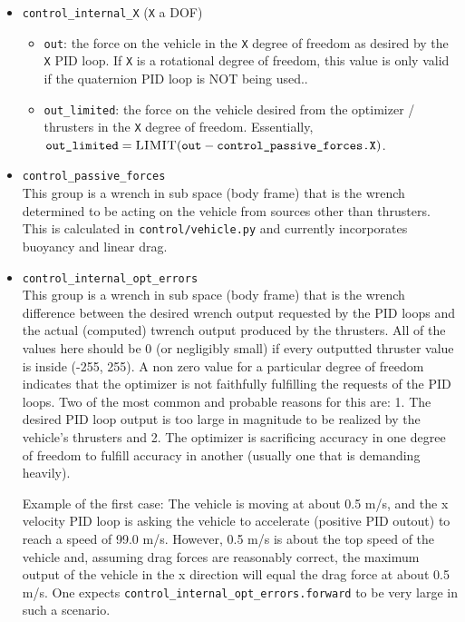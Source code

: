 \documentclass[11pt]{article}
\begin{document}
\begin{itemize}
    \item \texttt{control\_internal\_X} (\texttt{X} a DOF)\\
    \begin{itemize}
        \item \texttt{out}: the force on the vehicle in the \texttt{X} degree of freedom as desired by the \texttt{X} PID loop. If \texttt{X} is a rotational degree of freedom, this value is only valid if the quaternion PID loop is \textsc{NOT} being used..\\
        \item \texttt{out\_limited}: the force on the vehicle desired from the optimizer / thrusters in the \texttt{X} degree of freedom. Essentially, $\texttt{out\_limited} = \textsc{LIMIT}(\texttt{out} - \texttt{control\_passive\_forces.X})$.
    \end{itemize}

    \item \texttt{control\_passive\_forces}\\
        This group is a wrench in sub space (body frame) that is the wrench determined to be acting on the vehicle from sources other than thrusters. This is calculated in \texttt{control/vehicle.py} and currently incorporates buoyancy and linear drag.

    \item \texttt{control\_internal\_opt\_errors}\\
        This group is a wrench in sub space (body frame) that is the wrench difference between the desired wrench output requested by the PID loops and the actual (computed) twrench output produced by the thrusters. All of the values here should be 0 (or negligibly small) if every outputted thruster value is inside (-255, 255). A non zero value for a particular degree of freedom indicates that the optimizer is not faithfully fulfilling the requests of the PID loops. Two of the most common and probable reasons for this are: 1. The desired PID loop output is too large in magnitude to be realized by the vehicle's thrusters and 2. The optimizer is sacrificing accuracy in one degree of freedom to fulfill accuracy in another (usually one that is demanding heavily).

        Example of the first case: The vehicle is moving at about 0.5 m/s, and the x velocity PID loop is asking the vehicle to accelerate (positive PID outout) to reach a speed of 99.0 m/s. However, 0.5 m/s is about the top speed of the vehicle and, assuming drag forces are reasonably correct, the maximum output of the vehicle in the x direction will equal the drag force at about 0.5 m/s. One expects \texttt{control\_internal\_opt\_errors.forward} to be very large in such a scenario.


\end{itemize}
\end{document}
